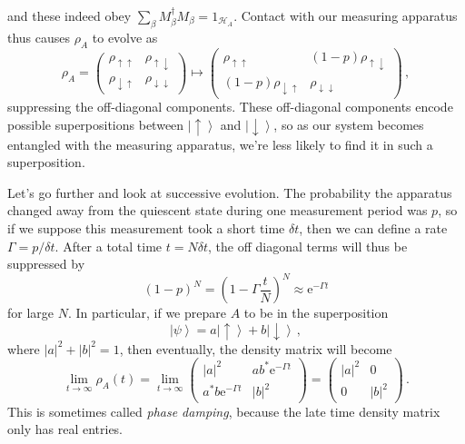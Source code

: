 \documentclass{article}
\theoremstyle{plain}\theoremheaderfont{\normalfont\itshape}\theorembodyfont{\rmfamily}\theoremseparator{.}\newtheorem*{rem}{Remark}\newtheorem*{ex}{Example}\newtheorem*{proof}{Proof}\newtheorem*{altp}{Alternative proof}
\theoremstyle{plain}\theoremheaderfont{\normalfont\bfseries}\theorembodyfont{\rmfamily}\theoremseparator{.}\newtheorem{thm}{Theorem}[section]\newtheorem{lem}[thm]{Lemma}\newtheorem{prop}[thm]{Proposition}\newtheorem*{cor}{Corollary}\newtheorem{defn}[thm]{Definition}\newtheorem{clm}[thm]{Claim}\newtheorem{clminproof}{Claim}
\theoremstyle{break}\theoremheaderfont{\normalfont\itshape}\theorembodyfont{\rmfamily}\theoremseparator{.\medskip}\newtheorem*{proofskip}{Proof}\newtheorem*{exs}{Examples}\newtheorem*{rems}{Remarks}
\theoremstyle{break}\theoremheaderfont{\normalfont\bfseries}\theorembodyfont{\rmfamily}\theoremseparator{.\medskip}\newtheorem{lemskip}[thm]{Lemma}\newtheorem{defnskip}[thm]{Definition}\newtheorem{propskip}[thm]{Proposition}\newtheorem{thmskip}[thm]{Theorem}
\numberwithin{equation}{section}
\newcommand{\ee}{\mathrm{e}}
\newcommand{\ket}[1]{\left| #1 \right\rangle}
\newcommand{\abs}[1]{\left| #1 \right|}
\newcommand{\hb}{\mathcal{H}}
\begin{document}
    and these indeed obey \(\sum_\beta M_\beta^\dagger M_\beta=1_{\hb_A}\). Contact with our measuring apparatus thus causes \(\rho_A\) to evolve as
    \begin{equation}
        \rho_{A}=\begin{pmatrix}
            \rho_{\uparrow\uparrow} & \rho_{\uparrow\downarrow}\\
            \rho_{\downarrow\uparrow} & \rho_{\downarrow\downarrow}
        \end{pmatrix}\longmapsto\begin{pmatrix}
            \rho_{\uparrow\uparrow} & (1-p)\rho_{\uparrow\downarrow} \\
            (1-p)\rho_{\downarrow\uparrow} & \rho_{\downarrow\downarrow}
        \end{pmatrix}\,,
    \end{equation}
    suppressing the off-diagonal components. These off-diagonal components encode possible superpositions between \(\ket{\uparrow}\) and \(\ket{\downarrow}\), so as our system becomes entangled with the measuring apparatus, we're less likely to find it in such a superposition.

    Let's go further and look at successive evolution. The probability the apparatus changed away from the quiescent state during one measurement period was \(p\), so if we suppose this measurement took a short time \(\delta t\), then we can define a rate \(\Gamma=p/\delta t\). After a total time \(t=N\delta t\), the off diagonal terms will thus be suppressed by
    \begin{equation}
        (1-p)^N=\left(1-\Gamma\frac{t}{N}\right)^N\approx \ee^{-\Gamma t}
    \end{equation}
    for large \(N\). In particular, if we prepare \(A\) to be in the superposition
    \begin{equation}
        \ket{\psi}=a\ket{\uparrow}+b\ket{\downarrow}\,,
    \end{equation}
    where \(\abs{a}^2+\abs{b}^2=1\), then eventually, the density matrix will become
    \begin{equation}
        \lim_{t\to\infty}\rho_A(t)=\lim_{t\to\infty}\begin{pmatrix}
            \abs{a}^2 & ab^* \ee^{-\Gamma t}\\
            a^*b \ee^{-\Gamma t} & \abs{b}^2
        \end{pmatrix}=\begin{pmatrix}
            \abs{a}^2 & 0\\
            0 & \abs{b}^2
        \end{pmatrix}\,.
    \end{equation}
    This is sometimes called \textit{phase damping}, because the late time density matrix only has real entries.
\end{document}
